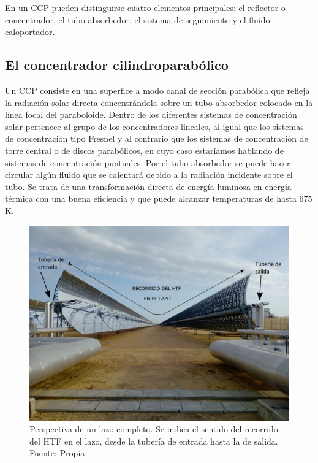 En un CCP pueden distinguirse cuatro elementos principales: el reflector o concentrador, el tubo absorbedor, el sistema de seguimiento y el fluido caloportador.

\subsection{El concentrador cilindroparabólico}
\label{concentrador}
Un CCP consiste en una superfice a modo canal  de sección parabólica que refleja la radiación solar directa concentrándola sobre un tubo absorbedor colocado en la línea focal del paraboloide. Dentro de los diferentes sistemas de concentración solar pertenece al grupo de los concentradores lineales, al igual que los sistemas de concentración tipo Fresnel y al contrario que los sistemas de concentración de torre central o de discos parabólicos, en cuyo caso estaríamos hablando de sistemas de concentración puntuales. Por el tubo absorbedor se puede hacer circular algún fluido que se calentará debido a la radiación incidente sobre el tubo.  Se trata de una transformación directa de energía luminosa en energía térmica con una buena eficiencia y que puede alcanzar temperaturas de hasta 675 K.

\begin{figure}
\includegraphics[width=0.9\linewidth]{images/entrada_salida_lazo2_texto.png}
\caption{Perspectiva de un lazo completo. Se indica el sentido del recorrido del HTF en el lazo, desde la tubería de entrada hasta la de salida. Fuente: Propia} 
\label{fig:entrada_salida_lazo}
\end{figure}


